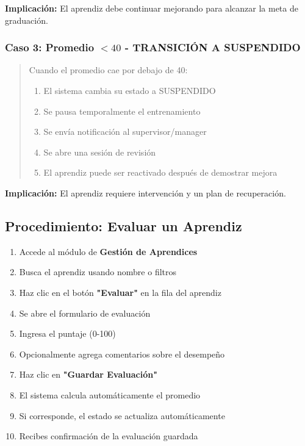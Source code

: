 \documentclass[12pt,a4paper,spanish,oneside]{report}
\begin{document}
\textbf{Implicación:} El aprendiz debe continuar mejorando para alcanzar la meta de graduación.

\subsubsection{Caso 3: Promedio $< 40$ - TRANSICIÓN A SUSPENDIDO}

\begin{quote}
Cuando el promedio cae por debajo de 40:

\begin{enumerate}
    \item El sistema cambia su estado a SUSPENDIDO
    \item Se pausa temporalmente el entrenamiento
    \item Se envía notificación al supervisor/manager
    \item Se abre una sesión de revisión
    \item El aprendiz puede ser reactivado después de demostrar mejora
\end{enumerate}
\end{quote}

\textbf{Implicación:} El aprendiz requiere intervención y un plan de recuperación.

\subsection{Procedimiento: Evaluar un Aprendiz}

\begin{enumerate}
    \item Accede al módulo de \textbf{Gestión de Aprendices}
    \item Busca el aprendiz usando nombre o filtros
    \item Haz clic en el botón \textbf{"Evaluar"} en la fila del aprendiz
    \item Se abre el formulario de evaluación
    \item Ingresa el puntaje (0-100)
    \item Opcionalmente agrega comentarios sobre el desempeño
    \item Haz clic en \textbf{"Guardar Evaluación"}
    \item El sistema calcula automáticamente el promedio
    \item Si corresponde, el estado se actualiza automáticamente
    \item Recibes confirmación de la evaluación guardada
\end{enumerate}
\end{document}
